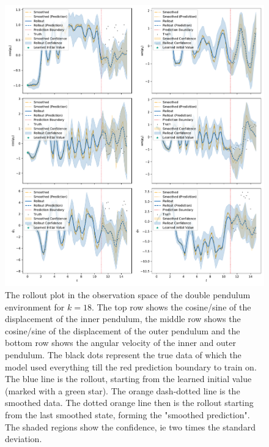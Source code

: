 			\begin{figure}
				\centering
				\includegraphics[width=\linewidth]{figures/results/acrobot-gym/run-latent-dim-30/rollout-observations-N0.pdf}
				\caption{The rollout plot in the observation space of the double pendulum environment for \(k = 18\). The top row shows the cosine/sine of the displacement of the inner pendulum, the middle row shows the cosine/sine of the displacement of the outer pendulum and the bottom row shows the angular velocity of the inner and outer pendulum. The black dots represent the true data of which the model used everything till the red prediction boundary to train on. The blue line is the rollout, starting from the learned initial value (marked with a green star). The orange dash-dotted line is the smoothed data. The dotted orange line then is the rollout starting from the last smoothed state, forming the "smoothed prediction". The shaded regions show the confidence, \ac{ie} two times the standard deviation.}
				\label{fig:acrobotRolloutL30}
			\end{figure}
